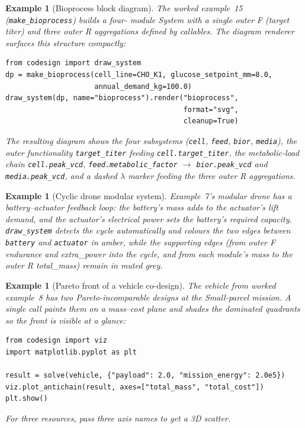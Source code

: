 \documentclass[11pt,a4paper]{article}
\newtheorem{example}[definition]{Example}
\begin{document}
\begin{example}[Bioprocess block diagram]
The worked example~15 (\texttt{make\_bioprocess}) builds a four-
module System with a single outer F (target titer) and three outer
R aggregations defined by callables. The diagram renderer surfaces
this structure compactly:
\begin{lstlisting}
from codesign import draw_system
dp = make_bioprocess(cell_line=CHO_K1, glucose_setpoint_mm=8.0,
                     annual_demand_kg=100.0)
draw_system(dp, name="bioprocess").render("bioprocess",
                                          format="svg",
                                          cleanup=True)
\end{lstlisting}
The resulting diagram shows the four subsystems
(\texttt{cell}, \texttt{feed}, \texttt{bior}, \texttt{media}),
the outer functionality \texttt{target\_titer} feeding
\texttt{cell.target\_titer}, the metabolic-load chain
\texttt{cell.peak\_vcd}, \texttt{feed.metabolic\_factor}
$\to$ \texttt{bior.peak\_vcd} and \texttt{media.peak\_vcd}, and a
dashed $\lambda$ marker feeding the three outer R aggregations.
\end{example}

\begin{example}[Cyclic drone modular system]
Example~7's modular drone has a battery--actuator feedback
loop: the battery's mass adds to the actuator's lift demand, and the
actuator's electrical power sets the battery's required capacity.
\texttt{draw\_system} detects the cycle automatically and colours
the two edges between \texttt{battery} and \texttt{actuator} in
amber, while the supporting edges (from outer F endurance and
extra\_power into the cycle, and from each module's mass to the
outer R total\_mass) remain in muted grey.
\end{example}

\begin{example}[Pareto front of a vehicle co-design]
The vehicle from worked example~8 has two Pareto-incomparable
designs at the Small-parcel mission. A single call paints them on a
mass--cost plane and shades the dominated quadrants so the front is
visible at a glance:
\begin{lstlisting}
from codesign import viz
import matplotlib.pyplot as plt

result = solve(vehicle, {"payload": 2.0, "mission_energy": 2.0e5})
viz.plot_antichain(result, axes=["total_mass", "total_cost"])
plt.show()
\end{lstlisting}
For three resources, pass three axis names to get a 3D scatter.
\end{example}
\end{document}
